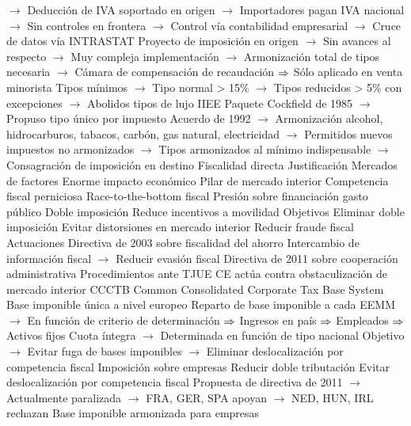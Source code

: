 \documentclass{nuevotema}
\begin{document}
\begin{esquemal}
				\4[] $\to$ Deducción de IVA soportado en origen
				\4[] $\to$ Importadores pagan IVA nacional
				\4[] $\to$ Sin controles en frontera
				\4[] $\to$ Control vía contabilidad empresarial
				\4[] $\to$ Cruce de datos vía INTRASTAT
				\4[] Proyecto de imposición en origen
				\4[] $\to$ Sin avances al respecto
				\4[] $\to$ Muy compleja implementación
				\4[] $\to$ Armonización total de tipos necesaria
				\4[] $\to$ Cámara de compensación de recaudación
				\4[] $\Rightarrow$ Sólo aplicado en venta minorista
				\4[] Tipos mínimos
				\4[] $\to$ Tipo normal > 15\%
				\4[] $\to$ Tipos reducidos > 5\% con excepciones
				\4[] $\to$ Abolidos tipos de lujo
				\4 IIEE
				\4[] Paquete Cockfield de 1985
				\4[] $\to$ Propuso tipo único por impuesto
				\4[] Acuerdo de 1992
				\4[] $\to$ Armonización alcohol, hidrocarburos, tabacos, carbón, gas natural, electricidad
				\4[] $\to$ Permitidos nuevos impuestos no armonizados
				\4[] $\to$ Tipos armonizados al mínimo indispensable
				\4[] $\to$ Consagración de imposición en destino
		\2 Fiscalidad directa
			\3 Justificación
				\4 Mercados de factores
				\4[] Enorme impacto económico
				\4[] Pilar de mercado interior
				\4 Competencia fiscal perniciosa
				\4[] Race-to-the-bottom fiscal
				\4[] Presión sobre financiación gasto público
				\4 Doble imposición
				\4[] Reduce incentivos a movilidad
			\3 Objetivos
				\4 Eliminar doble imposición
				\4 Evitar distorsiones en mercado interior
				\4 Reducir fraude fiscal
			\3 Actuaciones
				\4 Directiva de 2003 sobre fiscalidad del ahorro
				\4[] Intercambio de información fiscal
				\4[] $\to$ Reducir evasión fiscal
				\4 Directiva de 2011 sobre cooperación administrativa
				\4 Procedimientos ante TJUE
				\4[] CE actúa contra obstaculización de mercado interior
				\4 CCCTB
				\4[] Common Consolidated Corporate Tax Base System
				\4[] Base imponible única a nivel europeo
				\4[] Reparto de base imponible a cada EEMM
				\4[] $\to$ En función de criterio de determinación
				\4[] $\Rightarrow$ Ingresos en país
				\4[] $\Rightarrow$ Empleados
				\4[] $\Rightarrow$ Activos fijos
				\4[] Cuota íntegra
				\4[] $\to$ Determinada en función de tipo nacional
				\4[] Objetivo
				\4[] $\to$ Evitar fuga de bases imponibles
				\4[] $\to$ Eliminar deslocalización por competencia fiscal
				\4[] Imposición sobre empresas
				\4[] Reducir doble tributación
				\4[] Evitar deslocalización por competencia fiscal
				\4[] Propuesta de directiva de 2011
				\4[] $\to$ Actualmente paralizada
				\4[] $\to$ FRA, GER, SPA apoyan
				\4[] $\to$ NED, HUN, IRL rechazan
				\4[] Base imponible armonizada para empresas

\end{esquemal}
\end{document}

